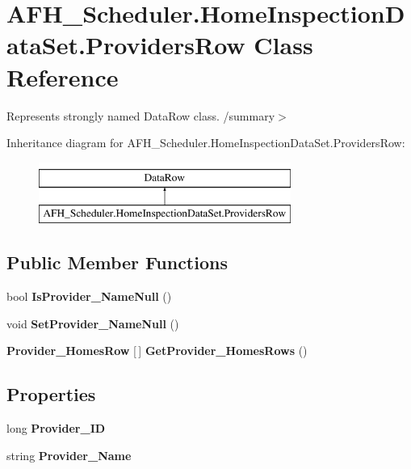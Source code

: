 \section{A\+F\+H\+\_\+\+Scheduler.\+Home\+Inspection\+Data\+Set.\+Providers\+Row Class Reference}
\label{class_a_f_h___scheduler_1_1_home_inspection_data_set_1_1_providers_row}


Represents strongly named Data\+Row class. /summary$>$  


Inheritance diagram for A\+F\+H\+\_\+\+Scheduler.\+Home\+Inspection\+Data\+Set.\+Providers\+Row\+:\begin{figure}[H]
\begin{center}
\leavevmode
\includegraphics[height=2.000000cm]{class_a_f_h___scheduler_1_1_home_inspection_data_set_1_1_providers_row}
\end{center}
\end{figure}
\subsection*{Public Member Functions}
\begin{DoxyCompactItemize}
\item 
\mbox{\label{class_a_f_h___scheduler_1_1_home_inspection_data_set_1_1_providers_row_a0a4dfee6b5b9926dad328df6a50553d6}} 
bool {\bfseries Is\+Provider\+\_\+\+Name\+Null} ()
\item 
\mbox{\label{class_a_f_h___scheduler_1_1_home_inspection_data_set_1_1_providers_row_acf8d418e4dcd77b44a24c8dc171d4c43}} 
void {\bfseries Set\+Provider\+\_\+\+Name\+Null} ()
\item 
\mbox{\label{class_a_f_h___scheduler_1_1_home_inspection_data_set_1_1_providers_row_ae91059f7ca9c285cffe66a9dc91dceb3}} 
\textbf{ Provider\+\_\+\+Homes\+Row} [$\,$] {\bfseries Get\+Provider\+\_\+\+Homes\+Rows} ()
\end{DoxyCompactItemize}
\subsection*{Properties}
\begin{DoxyCompactItemize}
\item 
\mbox{\label{class_a_f_h___scheduler_1_1_home_inspection_data_set_1_1_providers_row_a567f62de6b90888aab26ea3463d9484f}} 
long {\bfseries Provider\+\_\+\+ID}\hspace{0.3cm}{\ttfamily  [get, set]}
\item 
\mbox{\label{class_a_f_h___scheduler_1_1_home_inspection_data_set_1_1_providers_row_aba172b83d156985840bf7cd07fb56a79}} 
string {\bfseries Provider\+\_\+\+Name}\hspace{0.3cm}{\ttfamily  [get, set]}
\end{DoxyCompactItemize}


